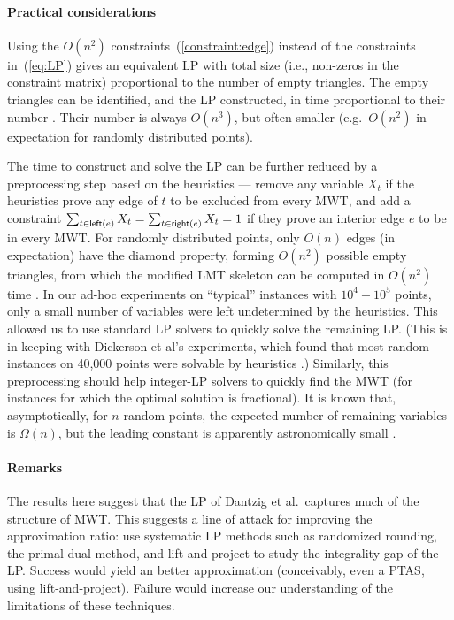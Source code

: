 \documentclass[final]{siamltex}
\newcommand{\leftside}{\text{\sf left}}
\newcommand{\rightside}{\text{\sf right}}
\newcommand{\refLP}{(\ref{eq:LP})\xspace}
\newcommand{\edge}{e}
\newcommand{\tri}{t}  \newcommand{\vertex}{v}
\newcommand{\fracTriang}{X}
\begin{document}
\paragraph{Practical considerations}
Using the $O(n^2)$ constraints~(\ref{constraint:edge})  
instead of the constraints in~\refLP gives an equivalent LP
with total size (i.e., non-zeros in the constraint matrix) 
proportional to the number of empty triangles.
The empty triangles can be identified, and the LP constructed, 
in time proportional to their number \cite{dobkin1990searching}.
Their number is always $O(n^3)$, 
but often smaller (e.g.~$O(n^2)$ in expectation for randomly distributed points).

The time to construct and solve the LP can be further reduced 
by a preprocessing step based on the heuristics
--- 
remove any variable $\fracTriang_\tri$ if the heuristics prove any edge of $\tri$ to be excluded from every MWT,
and add a constraint
$\sum_{\tri\in \leftside(\edge)} \fracTriang_\tri 
= \sum_{\tri\in \rightside(\edge)} \fracTriang_\tri = 1$ 
if they prove an interior edge $\edge$ to be in every MWT.
For randomly distributed points,
only $O(n)$ edges (in expectation) have the diamond property,
forming $O(n^2)$ possible empty triangles,
from which the modified LMT skeleton can be computed in $O(n^2)$ time
\cite{dickerson1997large,dickerson1997fast}.
In our ad-hoc experiments on ``typical'' instances with $10^4-10^5$ points,
only a small number of variables were left undetermined by the heuristics.
This allowed us to use standard LP solvers to quickly solve the remaining LP.
(This is in keeping with Dickerson et al's experiments, which found that most random
instances on 40,000 points were solvable by heuristics \cite{dickerson1997large}.)
Similarly, this preprocessing
should help integer-LP solvers to quickly find the MWT
(for instances for which the optimal solution is fractional).
It is known that, asymptotically, 
for $n$ random points, the expected number of remaining variables
is $\Omega(n)$, but the leading constant is apparently astronomically small
\cite{bose2002diamonds}.




\paragraph{Remarks} 
The results here suggest that the LP of Dantzig et al.\ captures
much of the structure of MWT.
This suggests a line of attack for improving the approximation ratio:
use systematic LP methods such as randomized rounding, the primal-dual method,
and lift-and-project \cite{balas2002lift} to study the integrality gap of the LP.
Success would yield an better approximation (conceivably, even a PTAS, using lift-and-project).
Failure would increase our understanding of the limitations of these techniques.
\end{document}
